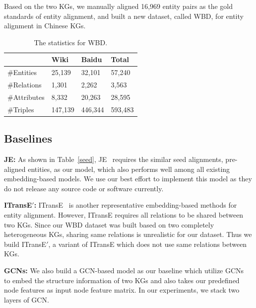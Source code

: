 	Based on the two KGs, we manually aligned 16,969 entity pairs as the gold standards of entity alignment, and built a new dataset, called WBD, for entity alignment in Chinese KGs. 
	\begin{table}
		\centering
		\begin{tabular}{llll}
			\toprule
			& Wiki & Baidu & Total \\
			\midrule
			\#Entities & 25,139 & 32,101 & 57,240 \\
			\#Relations & 1,301 & 2,262 & 3,563 \\
			\#Attributes & 8,332 & 20,263 & 28,595 \\
			\#Triples & 147,139 & 446,344 & 593,483 \\
			\bottomrule
		\end{tabular}
		\caption{The statistics for WBD.}
		\label{dataset}
	\end{table}
	
	\subsection{Baselines}
	
	\noindent \textbf{JE:} As shown in Table~\ref{seed}, JE~\cite{hao2016joint} requires the similar seed alignments, pre-aligned entities, as our model, which also performs well among all existing embedding-based models. We use our best effort to implement this model as they do not release any source code or software currently.
	
	\noindent \textbf{ITransE$'$:} ITransE~\cite{zhu2017iterative} is another representative embedding-based methods for entity alignment. However, ITransE requires all relations to be shared between two KGs. Since our WBD dataset was built based on two completely heterogeneous KGs, sharing same relations is unrealistic for our dataset. Thus we build ITransE$'$, a variant of ITransE which does not use same relations between KGs.
	
	\noindent \textbf{GCNs:} We also build a GCN-based model as our baseline which utilize GCNs~\cite{Kipf2016Semi} to embed the structure information of two KGs and also takes our predefined node features as input node feature matrix. In our experiments, we stack two layers of GCN.
	
